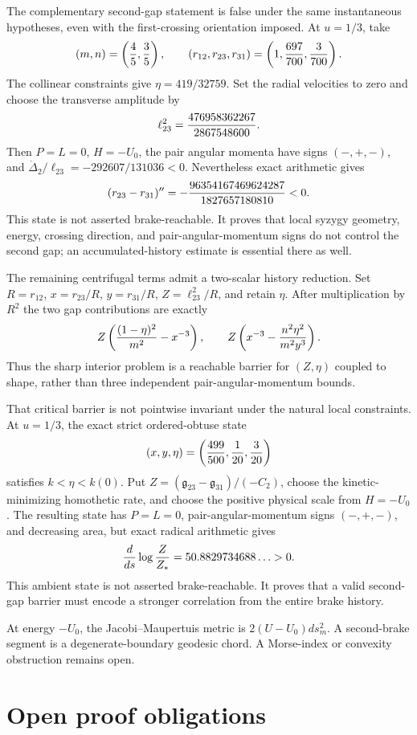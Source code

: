 \documentclass[11pt]{article}
\begin{document}
The complementary second-gap statement is false under the same
instantaneous hypotheses, even with the first-crossing orientation imposed.
At $u=1/3$, take
\[
 (m,n)=\left({4\over5},{3\over5}\right),\qquad
 (r_{12},r_{23},r_{31})=\left(1,{697\over700},{3\over700}\right).
\]
The collinear constraints give $\eta=419/32759$.  Set the radial velocities
to zero and choose the transverse amplitude by
\[
 \ell_{23}^2={476958362267\over2867548600}.
\]
Then $P=L=0$, $H=-U_0$, the pair angular momenta have signs $(-,+,-)$, and
$\dot\Delta_2/\ell_{23}=-292607/131036<0$.  Nevertheless exact arithmetic
gives
\[
 (r_{23}-r_{31})''
 =-{96354167469624287\over1827657180810}<0.
\]
This state is not asserted brake-reachable.  It proves that local syzygy
geometry, energy, crossing direction, and pair-angular-momentum signs do not control the
second gap; an accumulated-history estimate is essential there as well.

The remaining centrifugal terms admit a two-scalar history reduction.  Set
$R=r_{12}$, $x=r_{23}/R$, $y=r_{31}/R$,
$Z=\ell_{23}^2/R$, and retain $\eta$.  After multiplication by $R^2$ the two
gap contributions are exactly
\[
 Z\left({(1-\eta)^2\over m^2}-x^{-3}\right),\qquad
 Z\left(x^{-3}-{n^2\eta^2\over m^2y^3}\right).
\]
Thus the sharp interior problem is a reachable barrier for $(Z,\eta)$
coupled to shape, rather than three independent pair-angular-momentum bounds.

That critical barrier is not pointwise invariant under the natural local
constraints.  At $u=1/3$, the exact strict ordered-obtuse state
\[
 (x,y,\eta)=\left({499\over500},{1\over20},{3\over20}\right)
\]
satisfies $k<\eta<k(0)$.  Put
$Z=(\mathfrak g_{23}-\mathfrak g_{31})/(-C_2)$, choose the kinetic-minimizing
homothetic rate, and choose the positive physical scale from $H=-U_0$.
The resulting state has $P=L=0$, pair-angular-momentum signs $(-,+,-)$, and decreasing
area, but exact radical arithmetic gives
\[
 {d\over ds}\log{Z\over Z_*}=50.8829734688\ldots>0.
\]
This ambient state is not asserted brake-reachable.  It proves that a valid
second-gap barrier must encode a stronger correlation from the entire brake
history.

At energy $-U_0$, the Jacobi--Maupertuis metric is
$2(U-U_0)ds_m^2$.  A second-brake segment is a degenerate-boundary geodesic
chord.  A Morse-index or convexity obstruction remains open.

\section{Open proof obligations}
\end{document}
